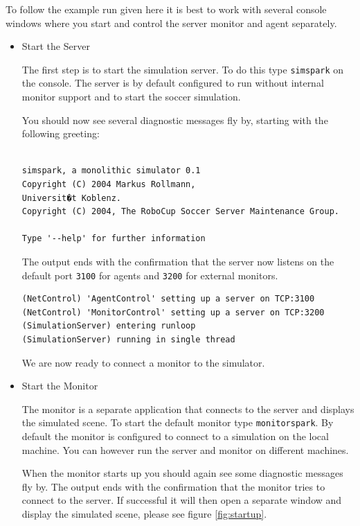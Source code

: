 To follow the example run given here it is best to work with several
console windows where you start and control the server monitor and
agent separately.

\begin{itemize}
\item{Start the Server}

The first step is to start the simulation server. To do this type
\texttt{simspark} on the console. The server is by default configured
to run without internal monitor support and to start the soccer
simulation. 

You should now see several diagnostic messages fly by, starting with
the following greeting:

\begin{verbatim}

simspark, a monolithic simulator 0.1
Copyright (C) 2004 Markus Rollmann,
Universit�t Koblenz.
Copyright (C) 2004, The RoboCup Soccer Server Maintenance Group.

Type '--help' for further information

\end{verbatim}

The output ends with the confirmation that the server now listens on
the default port \texttt{3100} for agents and \texttt{3200} for
external monitors.

\begin{verbatim}
(NetControl) 'AgentControl' setting up a server on TCP:3100
(NetControl) 'MonitorControl' setting up a server on TCP:3200
(SimulationServer) entering runloop
(SimulationServer) running in single thread
\end{verbatim}

We are now ready to connect a monitor to the simulator.


\item{Start the Monitor}

The monitor is a separate application that connects to the server and
displays the simulated scene. To start the default monitor type
\texttt{monitorspark}. By default the monitor is configured to connect to a simulation 
on the local machine. You can however run the server and monitor on
different machines.

When the monitor starts up you should again see some diagnostic
messages fly by. The output ends with the confirmation that the
monitor tries to connect to the server. If successful it will then open
a separate window and display the simulated scene, please see figure
\ref{fig:startup}.


\end{itemize}
